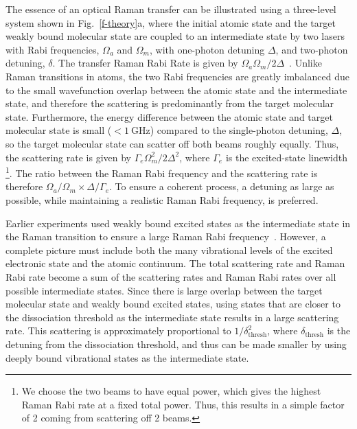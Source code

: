 \documentclass[aps,prl,twocolumn,10pt,superscriptaddress]{revtex4-1}
\begin{document}
The essence of an optical Raman transfer can be illustrated
using a three-level system shown in Fig.~\ref{f-theory}a,
where the initial atomic state and the target weakly bound molecular state are coupled to an intermediate state by two lasers with Rabi frequencies, $\Omega_a$ and $\Omega_m$, with one-photon detuning $ \Delta $, and two-photon detuning, $ \delta$.  %
The transfer Raman Rabi Rate is given by $\Omega_a\Omega_m / 2\Delta$~\cite{Wineland2003}.
Unlike Raman transitions in atoms, the two Rabi frequencies are greatly imbalanced %
due to the small wavefunction overlap between the atomic state and the intermediate state, %
and therefore the scattering is predominantly from the target molecular state. Furthermore, the energy difference between the atomic state and target molecular state is small ($ < 1~\mathrm{GHz} $) compared to the single-photon detuning, $ \Delta $, so the target molecular state can scatter off both beams roughly equally. Thus, the scattering rate is given by $ \Gamma_e \Omega_m^2 / 2\Delta^2$, where $ \Gamma_e $ is the excited-state linewidth \footnote{We choose the two beams to have equal power, which gives the highest Raman Rabi rate at a fixed total power. Thus, this results in a simple factor of 2 coming from scattering off 2 beams.}.
The ratio between the Raman Rabi frequency and the scattering rate is therefore $ \Omega_a/\Omega_m \times \Delta/\Gamma_e $. %
To ensure a coherent process, a detuning as large as possible, while maintaining a realistic Raman Rabi frequency, is preferred. %

Earlier experiments used weakly bound excited states as the intermediate state
in the Raman transition to ensure a large Raman Rabi frequency~\cite{Wynar2000,Rom2004}.
However, a complete picture must include both the many vibrational levels
of the excited electronic state and the atomic continuum.
The total scattering rate and Raman Rabi rate become a sum of the scattering rates
and Raman Rabi rates over all possible intermediate states.
Since there is large overlap between the target molecular state and weakly bound excited states, using states that are closer to the dissociation threshold as the intermediate state results in a large scattering rate.
This scattering is approximately proportional to $1/\delta_{\mathrm{thresh}}^2$,
where $\delta_{\mathrm{thresh}}$ is the detuning from the dissociation threshold,
and thus can be made smaller by using deeply bound vibrational states as the intermediate state.
\end{document}

